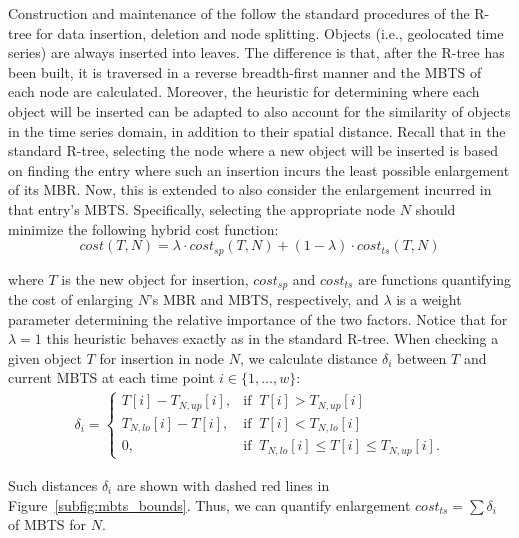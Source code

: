 Construction and maintenance of the \tsr follow the standard procedures of the R-tree for data insertion, deletion and node splitting. Objects (i.e., geolocated time series) are always inserted into leaves. The difference is that, after the R-tree has been built, it is traversed in a reverse breadth-first manner and the MBTS of each node are calculated. Moreover, the heuristic for determining where each object will be inserted can be adapted to also account for the similarity of objects in the time series domain, in addition to their spatial distance. Recall that in the standard R-tree, selecting the node where a new object will be inserted is based on finding the entry where such an insertion incurs the least possible enlargement of its MBR. Now, this is extended to also consider the enlargement incurred in that entry's MBTS. Specifically, selecting the appropriate node $N$ should minimize the following hybrid cost function:
\begin{equation}
 cost(T, N) = \lambda \cdot cost_{sp}(T, N) + (1 - \lambda) \cdot cost_{ts}(T, N)
 \label{eq:insertion_cost}
\end{equation}

\noindent where $T$ is the new object for insertion, $cost_{sp}$ and $cost_{ts}$ are functions quantifying the cost of enlarging $N$'s MBR and MBTS, respectively, and $\lambda$ is a weight parameter determining the relative importance of the two factors. Notice that for $\lambda = 1$ this heuristic behaves exactly as in the standard R-tree. When checking a given object $T$ for insertion in node $N$, we calculate distance $\delta_i$ between $T$ and current MBTS at each time point $i \in \{ 1, \dots, w \}$:
\begin{equation}
 \begin{split}
  \delta_i = \begin{cases}
	T[i] - T_{N, up}[i], & \text{if} \;\; T[i] > T_{N, up}[i] \\
	T_{N, lo}[i] - T[i], & \text{if} \;\; T[i] < T_{N, lo}[i] \\
	0, & \text{if} \;\; T_{N, lo}[i] \leq T[i] \leq T_{N, up}[i].
	  \end{cases}
 \end{split}
 \label{eq:delta_ts}
\end{equation}

\noindent Such distances $\delta_i$ are shown with dashed red lines in Figure~\ref{subfig:mbts_bounds}. Thus, we can quantify enlargement $cost_{ts} = \sum{\delta_i}$ of MBTS for $N$. 

